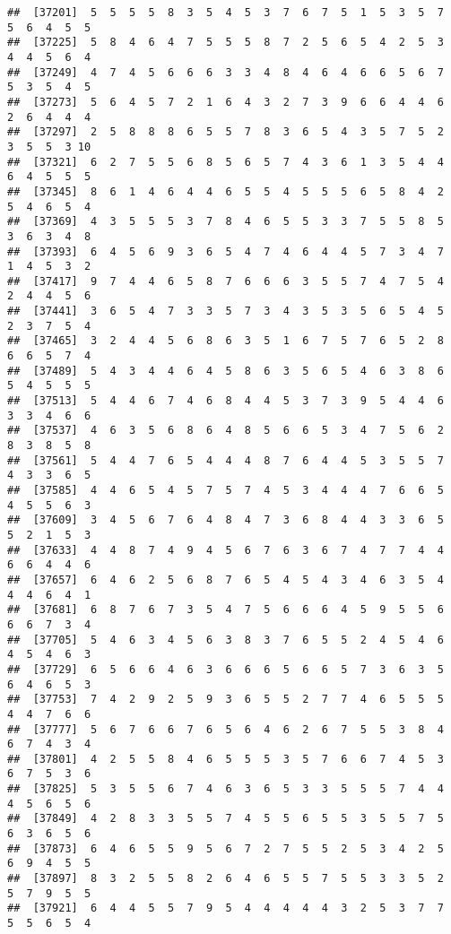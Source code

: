 \documentclass[
]{book}
\begin{document}
\begin{verbatim}
##  [37201]  5  5  5  5  8  3  5  4  5  3  7  6  7  5  1  5  3  5  7  5  6  4  5  5
##  [37225]  5  8  4  6  4  7  5  5  5  8  7  2  5  6  5  4  2  5  3  4  4  5  6  4
##  [37249]  4  7  4  5  6  6  6  3  3  4  8  4  6  4  6  6  5  6  7  5  3  5  4  5
##  [37273]  5  6  4  5  7  2  1  6  4  3  2  7  3  9  6  6  4  4  6  2  6  4  4  4
##  [37297]  2  5  8  8  8  6  5  5  7  8  3  6  5  4  3  5  7  5  2  3  5  5  3 10
##  [37321]  6  2  7  5  5  6  8  5  6  5  7  4  3  6  1  3  5  4  4  6  4  5  5  5
##  [37345]  8  6  1  4  6  4  4  6  5  5  4  5  5  5  6  5  8  4  2  5  4  6  5  4
##  [37369]  4  3  5  5  5  3  7  8  4  6  5  5  3  3  7  5  5  8  5  3  6  3  4  8
##  [37393]  6  4  5  6  9  3  6  5  4  7  4  6  4  4  5  7  3  4  7  1  4  5  3  2
##  [37417]  9  7  4  4  6  5  8  7  6  6  6  3  5  5  7  4  7  5  4  2  4  4  5  6
##  [37441]  3  6  5  4  7  3  3  5  7  3  4  3  5  3  5  6  5  4  5  2  3  7  5  4
##  [37465]  3  2  4  4  5  6  8  6  3  5  1  6  7  5  7  6  5  2  8  6  6  5  7  4
##  [37489]  5  4  3  4  4  6  4  5  8  6  3  5  6  5  4  6  3  8  6  5  4  5  5  5
##  [37513]  5  4  4  6  7  4  6  8  4  4  5  3  7  3  9  5  4  4  6  3  3  4  6  6
##  [37537]  4  6  3  5  6  8  6  4  8  5  6  6  5  3  4  7  5  6  2  8  3  8  5  8
##  [37561]  5  4  4  7  6  5  4  4  4  8  7  6  4  4  5  3  5  5  7  4  3  3  6  5
##  [37585]  4  4  6  5  4  5  7  5  7  4  5  3  4  4  4  7  6  6  5  4  5  5  6  3
##  [37609]  3  4  5  6  7  6  4  8  4  7  3  6  8  4  4  3  3  6  5  5  2  1  5  3
##  [37633]  4  4  8  7  4  9  4  5  6  7  6  3  6  7  4  7  7  4  4  6  6  4  4  6
##  [37657]  6  4  6  2  5  6  8  7  6  5  4  5  4  3  4  6  3  5  4  4  4  6  4  1
##  [37681]  6  8  7  6  7  3  5  4  7  5  6  6  6  4  5  9  5  5  6  6  6  7  3  4
##  [37705]  5  4  6  3  4  5  6  3  8  3  7  6  5  5  2  4  5  4  6  4  5  4  6  3
##  [37729]  6  5  6  6  4  6  3  6  6  6  5  6  6  5  7  3  6  3  5  6  4  6  5  3
##  [37753]  7  4  2  9  2  5  9  3  6  5  5  2  7  7  4  6  5  5  5  4  4  7  6  6
##  [37777]  5  6  7  6  6  7  6  5  6  4  6  2  6  7  5  5  3  8  4  6  7  4  3  4
##  [37801]  4  2  5  5  8  4  6  5  5  5  3  5  7  6  6  7  4  5  3  6  7  5  3  6
##  [37825]  5  3  5  5  6  7  4  6  3  6  5  3  3  5  5  5  7  4  4  4  5  6  5  6
##  [37849]  4  2  8  3  3  5  5  7  4  5  5  6  5  5  3  5  5  7  5  6  3  6  5  6
##  [37873]  6  4  6  5  5  9  5  6  7  2  7  5  5  2  5  3  4  2  5  6  9  4  5  5
##  [37897]  8  3  2  5  5  8  2  6  4  6  5  5  7  5  5  3  3  5  2  5  7  9  5  5
##  [37921]  6  4  4  5  5  7  9  5  4  4  4  4  4  3  2  5  3  7  7  5  5  6  5  4

\end{verbatim}
\end{document}
